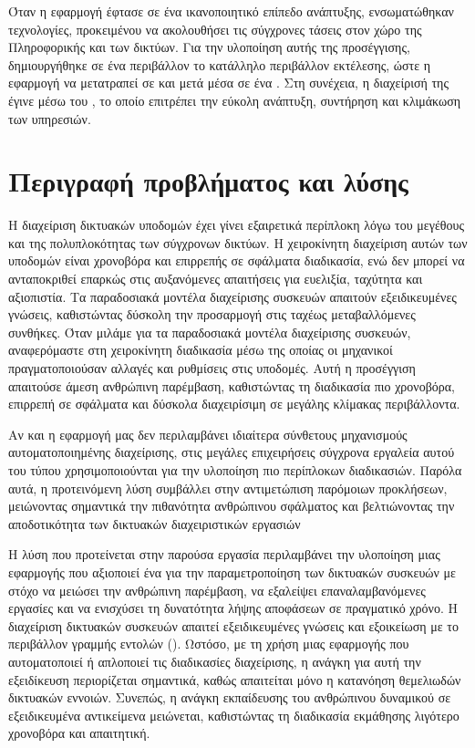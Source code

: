 Όταν η εφαρμογή έφτασε σε ένα ικανοποιητικό επίπεδο ανάπτυξης, ενσωματώθηκαν  τεχνολογίες, προκειμένου να ακολουθήσει τις σύγχρονες τάσεις στον χώρο της Πληροφορικής και των δικτύων. 
Για την υλοποίηση αυτής της προσέγγισης, δημιουργήθηκε σε ένα  περιβάλλον το κατάλληλο περιβάλλον εκτέλεσης, ώστε η εφαρμογή να μετατραπεί σε  και μετά  μέσα σε ένα . Στη συνέχεια, η διαχείρισή της έγινε μέσω του , το οποίο επιτρέπει την εύκολη ανάπτυξη, συντήρηση και κλιμάκωση των υπηρεσιών.


\section{Περιγραφή προβλήματος και λύσης}
Η διαχείριση δικτυακών υποδομών έχει γίνει εξαιρετικά περίπλοκη λόγω του μεγέθους και της πολυπλοκότητας των σύγχρονων δικτύων. 
Η χειροκίνητη διαχείριση αυτών των υποδομών είναι χρονοβόρα και επιρρεπής σε σφάλματα διαδικασία, ενώ δεν μπορεί να ανταποκριθεί επαρκώς στις 
αυξανόμενες απαιτήσεις για ευελιξία, ταχύτητα και αξιοπιστία. Τα παραδοσιακά μοντέλα διαχείρισης συσκευών απαιτούν εξειδικευμένες γνώσεις, 
καθιστώντας δύσκολη την προσαρμογή στις ταχέως μεταβαλλόμενες συνθήκες. Όταν μιλάμε για τα παραδοσιακά μοντέλα διαχείρισης συσκευών, αναφερόμαστε στη χειροκίνητη διαδικασία μέσω της οποίας οι μηχανικοί πραγματοποιούσαν αλλαγές και ρυθμίσεις στις υποδομές. Αυτή η προσέγγιση απαιτούσε άμεση ανθρώπινη παρέμβαση, καθιστώντας τη διαδικασία πιο χρονοβόρα, επιρρεπή σε σφάλματα και δύσκολα διαχειρίσιμη σε μεγάλης κλίμακας περιβάλλοντα. 

Αν και η εφαρμογή μας δεν περιλαμβάνει ιδιαίτερα σύνθετους μηχανισμούς αυτοματοποιημένης διαχείρισης, στις μεγάλες επιχειρήσεις 
σύγχρονα εργαλεία αυτού του τύπου χρησιμοποιούνται για την υλοποίηση πιο περίπλοκων διαδικασιών. Παρόλα αυτά, η προτεινόμενη λύση συμβάλλει στην αντιμετώπιση παρόμοιων προκλήσεων, μειώνοντας σημαντικά την πιθανότητα ανθρώπινου σφάλματος και βελτιώνοντας την αποδοτικότητα των δικτυακών διαχειριστικών εργασιών


Η λύση που προτείνεται στην παρούσα εργασία περιλαμβάνει την υλοποίηση μιας εφαρμογής που αξιοποιεί ένα  για την παραμετροποίηση των δικτυακών συσκευών με στόχο να μειώσει την ανθρώπινη παρέμβαση, να εξαλείψει επαναλαμβανόμενες εργασίες και να ενισχύσει τη δυνατότητα λήψης αποφάσεων σε πραγματικό χρόνο. Η διαχείριση δικτυακών συσκευών απαιτεί εξειδικευμένες γνώσεις και εξοικείωση με το περιβάλλον γραμμής εντολών (). Ωστόσο, με τη χρήση μιας εφαρμογής που αυτοματοποιεί ή απλοποιεί τις διαδικασίες διαχείρισης, η ανάγκη για αυτή την εξειδίκευση περιορίζεται σημαντικά, καθώς απαιτείται μόνο η κατανόηση θεμελιωδών δικτυακών εννοιών. Συνεπώς, η ανάγκη εκπαίδευσης του ανθρώπινου δυναμικού σε εξειδικευμένα αντικείμενα μειώνεται, καθιστώντας τη διαδικασία εκμάθησης λιγότερο χρονοβόρα και απαιτητική.

